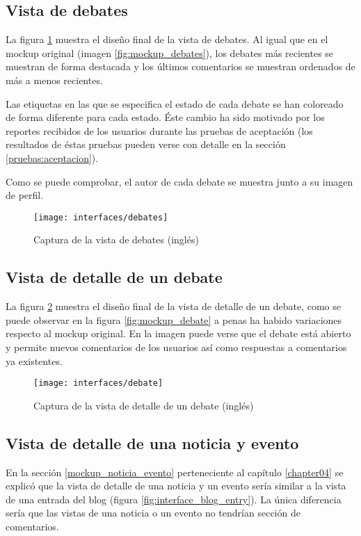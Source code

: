\subsection{Vista de debates}
La figura \ref{fig:interface_debates} muestra el diseño final de la vista de debates. Al igual que en el mockup original (imagen \ref{fig:mockup_debates}), los debates más recientes se muestran de forma destacada y los últimos comentarios se muestran ordenados de más a menos recientes.

Las etiquetas en las que se especifica el estado de cada debate se han coloreado de forma diferente para cada estado.  Éste cambio ha sido motivado por los reportes recibidos de los usuarios durante las pruebas de aceptación (los resultados de éstas pruebas pueden verse con detalle en la sección \ref{pruebas:aceptacion}).

Como se puede comprobar, el autor de cada debate se muestra junto a su imagen de perfil.
\begin{figure}[h]
	\centering
	\texttt{[image: interfaces/debates]}
	\caption{Captura de la vista de debates (inglés)}
	\label{fig:interface_debates}
\end{figure}


\subsection{Vista de detalle de un debate}
La figura \ref{fig:interface_debate} muestra el diseño final de la vista de detalle de un debate,  como se puede observar en la figura \ref{fig:mockup_debate} a penas ha habido variaciones respecto al mockup original.  En la imagen puede verse que el debate está abierto y permite nuevos comentarios de los usuarios así como respuestas a comentarios ya existentes.

\begin{figure}[h]
	\centering
	\texttt{[image: interfaces/debate]}
	\caption{Captura de la vista de detalle de un debate (inglés)}
	\label{fig:interface_debate}
\end{figure}


\subsection{Vista de detalle de una noticia y evento}
En la sección \ref{mockup_noticia_evento} perteneciente al capítulo \ref{chapter04} se explicó que la vista de detalle de una noticia y un evento sería similar a la vista de una entrada del blog (figura \ref{fig:interface_blog_entry}).  La única diferencia sería que las vistas de una noticia o un evento no tendrían sección de comentarios.

